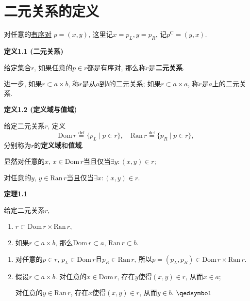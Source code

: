 \documentclass[UTF8]{ctexart}
\begin{document}
\setlength{\abovedisplayskip}{1pt}
\setlength{\belowdisplayskip}{1pt}


\section{二元关系的定义}

对任意的\href{01 集合的简单运算#nameddest=sec:定义2.2}{有序对}
$p=(x,y)$, 这里记$x=p_L,y=p_R$, 记$p^\mathrm{C}=(y,x)$.

\vspace{10pt}

\hypertarget{sec:定义1.1}{}
\noindent\textbf{定义1.1 (二元关系)}

给定集合$r$, 如果任意的$p\in r$都是有序对, 那么称$r$是\textbf{二元关系}.

进一步, 如果$r\subset a\times b$, 称$r$是从$a$到$b$的二元关系;
如果$r\subset a\times a$, 称$r$是$a$上的二元关系.

\vspace{10pt}

\hypertarget{sec:定义1.2}{}
\noindent\textbf{定义1.2 (定义域与值域)}

给定二元关系$r$, 定义
\[
    \mathrm{Dom}\,r\overset{\mathrm{def}}{=}\{p_L\mid p\in r\},\quad
    \mathrm{Ran}\,r\overset{\mathrm{def}}{=}\{p_R\mid p\in r\},
\]
分别称为$r$的\textbf{定义域}和\textbf{值域}.

显然对任意的$x$, $x\in\mathrm{Dom}\,r$当且仅当$\exists y:(x,y)\in r$;

对任意的$y$, $y\in\mathrm{Ran}\,r$当且仅当$\exists x:(x,y)\in r$.

\vspace{10pt}

\hypertarget{sec:定理1.1}{}
\noindent\textbf{定理1.1}

给定二元关系$r$,
\begin{enumerate}
    \item $r\subset\mathrm{Dom}\,r\times\mathrm{Ran}\,r$,
    \item 如果$r\subset a\times b$,
    那么$\mathrm{Dom}\,r\subset a$, $\mathrm{Ran}\,r\subset b$.
\end{enumerate}


\begin{enumerate}
    \item 对任意的$p\in r$, $p_L\in\mathrm{Dom}\,r$且$p_R\in\mathrm{Ran}\,r$,
    所以$p=(p_L,p_R)\in\mathrm{Dom}\,r\times\mathrm{Ran}\,r$.
    \item 假设$r\subset a\times b$. 对任意的$x\in\mathrm{Dom}\,r$,
    存在$y$使得$(x,y)\in r$, 从而$x\in a$;

    \hspace{2.17em}
    对任意的$y\in\mathrm{Ran}\,r$, 存在$x$使得$(x,y)\in r$, 从而$y\in b$.
    \hfill $\qedsymbol$
\end{enumerate}
\end{document}
